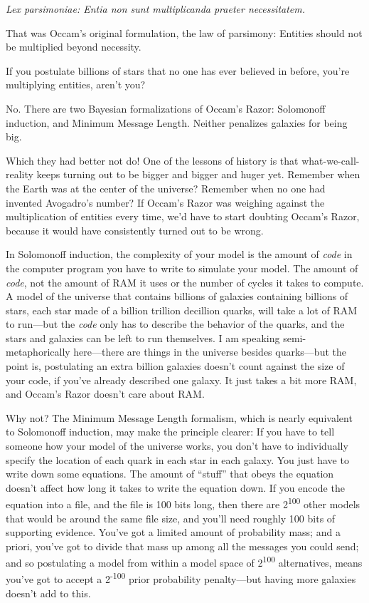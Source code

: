 {
 \textit{Lex parsimoniae: Entia non sunt multiplicanda praeter
necessitatem.}}

{
 That was Occam's original formulation, the law of
parsimony: Entities should not be multiplied beyond necessity.}

{
 If you postulate billions of stars that no one has ever believed
in before, you're multiplying entities,
aren't you?}

{
 No. There are two Bayesian formalizations of
Occam's Razor: Solomonoff induction, and Minimum
Message Length. Neither penalizes galaxies for being big.}

{
 Which they had better not do! One of the lessons of history is
that what-we-call-reality keeps turning out to be bigger and bigger and
huger yet. Remember when the Earth was at the center of the universe?
Remember when no one had invented Avogadro's number? If
Occam's Razor was weighing against the multiplication
of entities every time, we'd have to start doubting
Occam's Razor, because it would have consistently
turned out to be wrong.}

{
 In Solomonoff induction, the complexity of your model is the
amount of \textit{code} in the computer program you have to write to
simulate your model. The amount of \textit{code}, not the amount of RAM
it uses or the number of cycles it takes to compute. A model of the
universe that contains billions of galaxies containing billions of
stars, each star made of a billion trillion decillion quarks, will take
a lot of RAM to run---but the \textit{code} only has to describe the
behavior of the quarks, and the stars and galaxies can be left to run
themselves. I am speaking semi-metaphorically here---there are things
in the universe besides quarks---but the point is, postulating an extra
billion galaxies doesn't count against the size of your
code, if you've already described one galaxy. It just
takes a bit more RAM, and Occam's Razor
doesn't care about RAM.}

{
 Why not? The Minimum Message Length formalism, which is nearly
equivalent to Solomonoff induction, may make the principle clearer: If
you have to tell someone how your model of the universe works, you
don't have to individually specify the location of each
quark in each star in each galaxy. You just have to write down some
equations. The amount of ``stuff''
that obeys the equation doesn't affect how long it
takes to write the equation down. If you encode the equation into a
file, and the file is 100 bits long, then there are
2\textsuperscript{100} other models that would be around the same file
size, and you'll need roughly 100 bits of supporting
evidence. You've got a limited amount of probability
mass; and a priori, you've got to divide that mass up
among all the messages you could send; and so postulating a model from
within a model space of 2\textsuperscript{100} alternatives, means
you've got to accept a 2\textsuperscript{{}-100} prior
probability penalty---but having more galaxies doesn't
add to this.}

